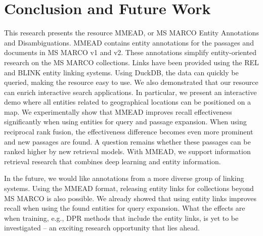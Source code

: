 \section{Conclusion and Future Work}
This research presents the resource MMEAD, or MS MARCO Entity Annotations and Disambiguations. MMEAD contains entity annotations for the passages and documents in MS MARCO v1 and v2. These annotations simplify entity-oriented research on the MS MARCO collections. Links have been provided using the REL and BLINK entity linking systems. Using DuckDB, the data can quickly be queried, making the resource easy to use. 
We also demonstrated that our resource can enrich interactive search applications. In particular, we present an interactive demo where all entities related to geographical locations can be positioned on a map. We experimentally show that MMEAD improves recall effectiveness significantly when using entities for query and passage expansion. When using reciprocal rank fusion, the effectiveness difference becomes even more prominent and new passages are found. A question remains whether these passages can be ranked higher by new retrieval models. With MMEAD, we support information retrieval research that combines deep learning and entity information. 

In the future, we would like annotations from a more diverse group of linking systems. Using the MMEAD format, releasing entity links for collections beyond MS MARCO is also possible. We already showed that using entity links improves recall when using the found entities for query expansion. What the effects are when training, e.g., DPR methods that include the entity links, is yet to be investigated -- an exciting research opportunity that lies ahead. 
